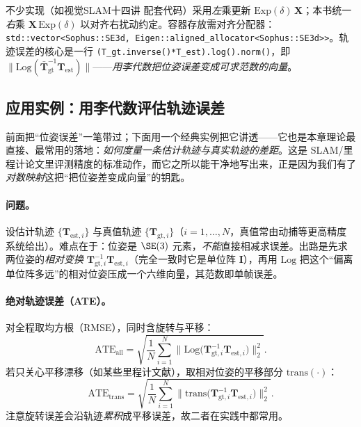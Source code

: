 \begin{note}
不少实现（如视觉SLAM十四讲\cite{gaoxiang2019slam14} 配套代码）采用\emph{左}乘更新 $\mathrm{Exp}(\delta)\,\mathbf{X}$；本书统一\emph{右}乘 $\mathbf{X}\,\mathrm{Exp}(\delta)$ 以对齐右扰动约定。容器存放需对齐分配器：\texttt{std::vector<Sophus::SE3d, Eigen::aligned\_allocator<Sophus::SE3d>>}。轨迹误差的核心是一行 \texttt{(T\_gt.inverse()*T\_est).log().norm()}，即 $\|\mathrm{Log}(\bar{\mathbf{T}}_{\text{gt}}^{-1}\mathbf{T}_{\text{est}})\|$——\emph{用李代数把位姿误差变成可求范数的向量}。
\end{note}

\subsection{应用实例：用李代数评估轨迹误差}
\label{sec:traj-error}

前面把“位姿误差”一笔带过；下面用一个经典实例把它讲透\cite{gaoxiang2019slam14}——它也是本章理论最直接、最常用的落地：\emph{如何度量一条估计轨迹与真实轨迹的差距}。这是 SLAM/里程计论文里评测精度的标准动作，而它之所以能干净地写出来，正是因为我们有了\emph{对数映射}这把“把位姿差变成向量”的钥匙。

\paragraph{问题。}设估计轨迹 $\{\mathbf{T}_{\mathrm{est},i}\}$ 与真值轨迹 $\{\mathbf{T}_{\mathrm{gt},i}\}$（$i=1,\dots,N$，真值常由动捕等更高精度系统给出）。难点在于：位姿是 $\SE(3)$ 元素，\emph{不能}直接相减求误差。出路是先求两位姿的\emph{相对变换} $\mathbf{T}_{\mathrm{gt},i}^{-1}\mathbf{T}_{\mathrm{est},i}$（完全一致时它是单位阵 $\mathbf{I}$），再用 $\mathrm{Log}$ 把这个“偏离单位阵多远”的相对位姿压成一个六维向量，其范数即单帧误差。

\paragraph{绝对轨迹误差（ATE）。}对全程取均方根（RMSE），同时含旋转与平移：
\begin{equation}
  \mathrm{ATE}_{\text{all}}=\sqrt{\frac{1}{N}\sum_{i=1}^{N}\big\|\mathrm{Log}\big(\mathbf{T}_{\mathrm{gt},i}^{-1}\mathbf{T}_{\mathrm{est},i}\big)\big\|_2^2}.
  \label{eq:ate-all}
\end{equation}
若只关心平移漂移（如某些里程计文献），取相对位姿的平移部分 $\mathrm{trans}(\cdot)$：
\begin{equation}
  \mathrm{ATE}_{\text{trans}}=\sqrt{\frac{1}{N}\sum_{i=1}^{N}\big\|\mathrm{trans}\big(\mathbf{T}_{\mathrm{gt},i}^{-1}\mathbf{T}_{\mathrm{est},i}\big)\big\|_2^2}.
  \label{eq:ate-trans}
\end{equation}
注意旋转误差会沿轨迹\emph{累积}成平移误差，故二者在实践中都常用。

